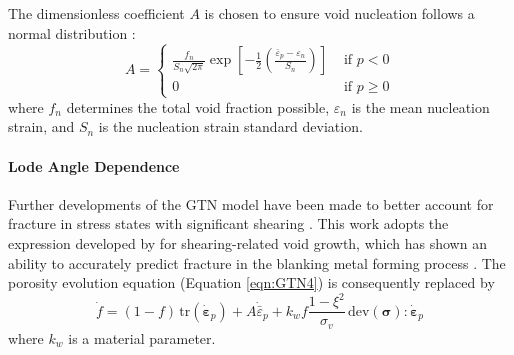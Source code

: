 \documentclass[sn-mathphys,Numbered]{sn-jnl}%
\newcommand{\bb}{\boldsymbol}
\begin{document}
The dimensionless coefficient $A$ is chosen to ensure void nucleation follows a normal distribution \cite{chu_void_1980}:
\begin{equation} \label{eqn:nucleatonA}
	A =
	\begin{cases}
	\frac{f_n}{S_n \sqrt{2 \pi}} \exp \left[-\frac{1}{2}\left(\frac{\bar{\varepsilon}_p-\varepsilon_n}{S_n}\right)\right] & \text { if } p < 0 \\
	0 & \text { if } p \geq 0
	\end{cases}
\end{equation}
where $f_n$ determines the total void fraction possible, $\varepsilon_n$ is the mean nucleation strain, and $S_n$ is the nucleation strain standard deviation. 



\paragraph{Lode Angle Dependence}

Further developments of the GTN model have been made to better account for fracture in stress states with significant shearing \cite{nahshon_modification_2008, malcher_continuum_2012, leclerc_micromechanics-based_2020, achouri_numerical_2013}.
This work adopts the expression developed by \citet{nahshon_modification_2008} for shearing-related void growth, which has shown an ability to accurately predict fracture in the blanking metal forming process \cite{achouri_numerical_2013}.
The porosity evolution equation (Equation \ref{eqn:GTN4}) is consequently replaced by
\begin{equation}
	\dot{f} = (1-f) \, \text{tr}\left(\dot{\boldsymbol{\varepsilon}}_p\right)+A \dot{\bar{\varepsilon}}_p
	+ k_w f\frac{1 - \xi^2 }{\sigma_v} \,\text{dev}(\bb{\sigma}):{\dot{\boldsymbol{\varepsilon}}}_p
\end{equation}
where $k_w$ is a material parameter.
\end{document}
